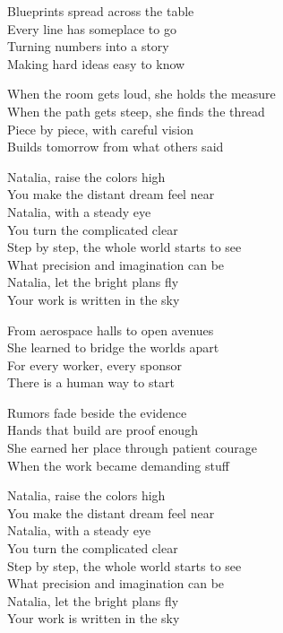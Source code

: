 \begin{lyrics}
Blueprints spread across the table\\
Every line has someplace to go\\
Turning numbers into a story\\
Making hard ideas easy to know

When the room gets loud, she holds the measure\\
When the path gets steep, she finds the thread\\
Piece by piece, with careful vision\\
Builds tomorrow from what others said

Natalia, raise the colors high\\
You make the distant dream feel near\\
Natalia, with a steady eye\\
You turn the complicated clear\\
Step by step, the whole world starts to see\\
What precision and imagination can be\\
Natalia, let the bright plans fly\\
Your work is written in the sky

From aerospace halls to open avenues\\
She learned to bridge the worlds apart\\
For every worker, every sponsor\\
There is a human way to start

Rumors fade beside the evidence\\
Hands that build are proof enough\\
She earned her place through patient courage\\
When the work became demanding stuff

Natalia, raise the colors high\\
You make the distant dream feel near\\
Natalia, with a steady eye\\
You turn the complicated clear\\
Step by step, the whole world starts to see\\
What precision and imagination can be\\
Natalia, let the bright plans fly\\
Your work is written in the sky


\end{lyrics}
